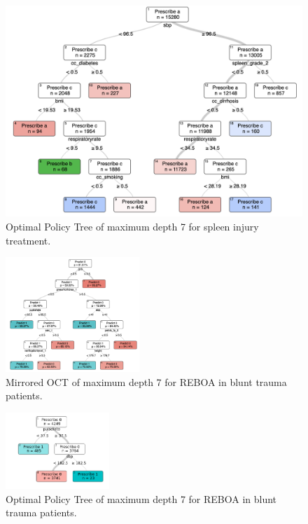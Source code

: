 \documentclass[10pt]{article} %
\begin{document}
\begin{figure}
  \begin{center}
    \caption{Optimal Policy Tree of maximum depth 7 for spleen injury treatment.}\label{fig:spleen-opt}
  \includegraphics[height=0.35\textwidth]{images/Spleen_OPT_seed3_iter5.png}
  \end{center}
\end{figure}


\begin{figure}
  \begin{center}
    \caption{Mirrored OCT of maximum depth 7 for REBOA in blunt trauma patients.}\label{fig:reboa-octpnn}
  \includegraphics[width=0.45\textwidth]{images/REBOA_OCT_seed1_iter3.png}
  \end{center}
\end{figure}

\begin{figure}
  \begin{center}
    \caption{Optimal Policy Tree of maximum depth 7 for REBOA in blunt trauma patients.}\label{fig:reboa-opt}
  \includegraphics[width=0.35\textwidth]{images/REBOA_OPT_seed2_iter1.png}
  \end{center}
\end{figure}
\end{document}
